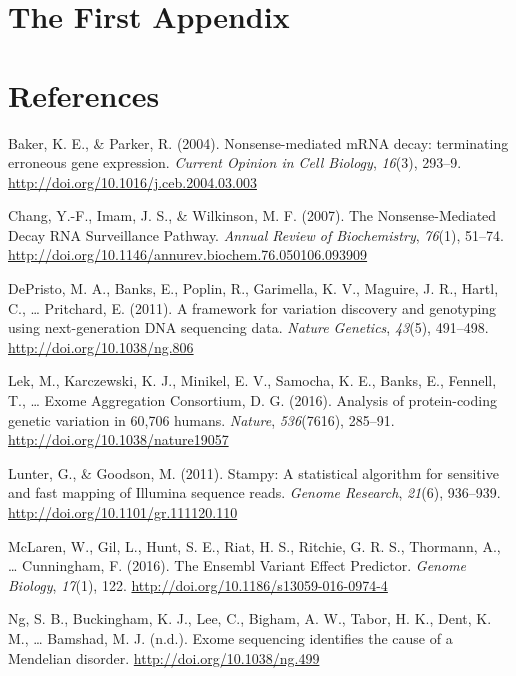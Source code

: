 \documentclass[12pt,twoside]{reedthesis}
\theoremstyle{definition}
\theoremstyle{definition}
\theoremstyle{remark}
\begin{document}
  \chapter{The First Appendix}\label{the-first-appendix}
  
  \chapter*{References}\label{references}
  
  \hypertarget{refs}{}
  \hypertarget{ref-Baker2004}{}
  Baker, K. E., \& Parker, R. (2004). Nonsense-mediated mRNA decay:
  terminating erroneous gene expression. \emph{Current Opinion in Cell
  Biology}, \emph{16}(3), 293--9.
  \url{http://doi.org/10.1016/j.ceb.2004.03.003}
  
  \hypertarget{ref-Chang2007}{}
  Chang, Y.-F., Imam, J. S., \& Wilkinson, M. F. (2007). The
  Nonsense-Mediated Decay RNA Surveillance Pathway. \emph{Annual Review of
  Biochemistry}, \emph{76}(1), 51--74.
  \url{http://doi.org/10.1146/annurev.biochem.76.050106.093909}
  
  \hypertarget{ref-DePristo2011}{}
  DePristo, M. A., Banks, E., Poplin, R., Garimella, K. V., Maguire, J.
  R., Hartl, C., \ldots{} Pritchard, E. (2011). A framework for variation
  discovery and genotyping using next-generation DNA sequencing data.
  \emph{Nature Genetics}, \emph{43}(5), 491--498.
  \url{http://doi.org/10.1038/ng.806}
  
  \hypertarget{ref-Lek2016}{}
  Lek, M., Karczewski, K. J., Minikel, E. V., Samocha, K. E., Banks, E.,
  Fennell, T., \ldots{} Exome Aggregation Consortium, D. G. (2016).
  Analysis of protein-coding genetic variation in 60,706 humans.
  \emph{Nature}, \emph{536}(7616), 285--91.
  \url{http://doi.org/10.1038/nature19057}
  
  \hypertarget{ref-Lunter2011}{}
  Lunter, G., \& Goodson, M. (2011). Stampy: A statistical algorithm for
  sensitive and fast mapping of Illumina sequence reads. \emph{Genome
  Research}, \emph{21}(6), 936--939.
  \url{http://doi.org/10.1101/gr.111120.110}
  
  \hypertarget{ref-McLaren2016}{}
  McLaren, W., Gil, L., Hunt, S. E., Riat, H. S., Ritchie, G. R. S.,
  Thormann, A., \ldots{} Cunningham, F. (2016). The Ensembl Variant Effect
  Predictor. \emph{Genome Biology}, \emph{17}(1), 122.
  \url{http://doi.org/10.1186/s13059-016-0974-4}
  
  \hypertarget{ref-Ng}{}
  Ng, S. B., Buckingham, K. J., Lee, C., Bigham, A. W., Tabor, H. K.,
  Dent, K. M., \ldots{} Bamshad, M. J. (n.d.). Exome sequencing identifies
  the cause of a Mendelian disorder. \url{http://doi.org/10.1038/ng.499}
  
\end{document}
